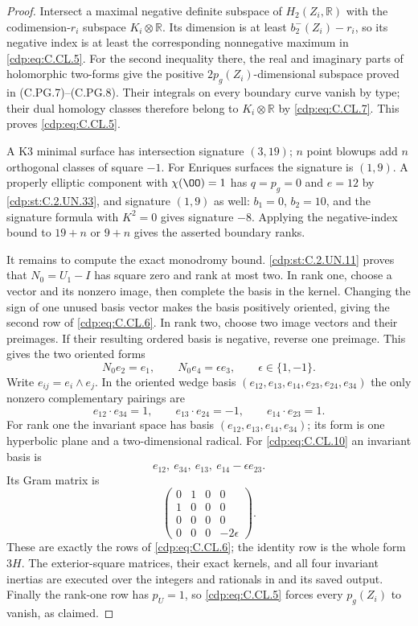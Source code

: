 \begin{proof}
Intersect a maximal negative definite
subspace of $H_2(Z_i,\mathbb R)$ with
the codimension-$r_i$ subspace $K_i\otimes\mathbb R$.
Its dimension is at least
$b_2^-(Z_i)-r_i$, so its negative index
is at least the corresponding nonnegative
maximum in \eqref{cdp:eq:C.CL.5}. For the second
inequality there, the real and imaginary
parts of holomorphic two-forms give the
positive $2p_g(Z_i)$-dimensional subspace
proved in (C.PG.7)--(C.PG.8). Their
integrals on every boundary curve
vanish by type; their dual homology
classes therefore belong to
$K_i\otimes\mathbb R$ by \eqref{cdp:eq:C.CL.7}.
This proves \eqref{cdp:eq:C.CL.5}.

A K3 minimal surface has intersection
signature $(3,19)$; $n$ point blowups
add $n$ orthogonal classes of square
$-1$. For Enriques surfaces the
signature is $(1,9)$. A properly
elliptic component with $\chi(\OO)=1$
has $q=p_g=0$ and $e=12$ by \ref{cdp:st:C.2.UN.33},
and signature $(1,9)$ as well:
$b_1=0$, $b_2=10$, and the signature
formula with $K^2=0$ gives signature
$-8$. Applying the negative-index
bound to $19+n$ or $9+n$ gives
the asserted boundary ranks.

It remains to compute the exact
monodromy bound. \ref{cdp:st:C.2.UN.11} proves
that $N_0=U_1-I$ has square zero
and rank at most two. In rank one,
choose a vector and its nonzero
image, then complete the basis in
the kernel. Changing the sign of
one unused basis vector makes the
basis positively oriented, giving
the second row of \eqref{cdp:eq:C.CL.6}.
In rank two, choose two image
vectors and their preimages. If
their resulting ordered basis is
negative, reverse one preimage.
This gives the two oriented forms
\[
          N_0e_2=e_1,\qquad N_0e_4=\epsilon e_3,
                     \qquad\epsilon\in\{1,-1\}.     \tag{C.CL.10}\label{cdp:eq:C.CL.10}
\]
Write $e_{ij}=e_i\wedge e_j$.
In the oriented wedge basis
$(e_{12},e_{13},e_{14},e_{23},e_{24},e_{34})$
the only nonzero complementary
pairings are
\[
 e_{12}\cdot e_{34}=1,\qquad
 e_{13}\cdot e_{24}=-1,\qquad
 e_{14}\cdot e_{23}=1.                              \tag{C.CL.11}\label{cdp:eq:C.CL.11}
\]
For rank one the invariant space
has basis $(e_{12},e_{13},e_{14},e_{34})$;
its form is one hyperbolic plane
and a two-dimensional radical.
For \eqref{cdp:eq:C.CL.10} an invariant basis is
\[
       e_{12},\ e_{34},\ e_{13},\ e_{14}-\epsilon e_{23}.
                                                               \tag{C.CL.12}\label{cdp:eq:C.CL.12}
\]
Its Gram matrix is
\[
 \begin{pmatrix}
 0&1&0&0\\
 1&0&0&0\\
 0&0&0&0\\
 0&0&0&-2\epsilon
 \end{pmatrix}.                                               \tag{C.CL.13}\label{cdp:eq:C.CL.13}
\]
These are exactly the rows of
\eqref{cdp:eq:C.CL.6}; the identity row is
the whole form $3H$.
The exterior-square matrices,
their exact kernels, and all
four invariant inertias are
executed over the integers and
rationals in
and its saved output. Finally
the rank-one row has $p_U=1$,
so \eqref{cdp:eq:C.CL.5} forces every
$p_g(Z_i)$ to vanish, as claimed.
\end{proof}


